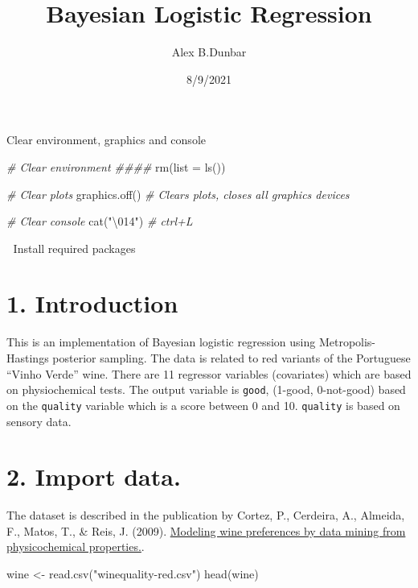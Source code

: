 \documentclass[
]{article}
\title{Bayesian Logistic Regression}
\author{Alex B.Dunbar}
\date{8/9/2021}
\newenvironment{Shaded}{\begin{snugshade}}{\end{snugshade}}
\newcommand{\AttributeTok}[1]{\textcolor[rgb]{0.77,0.63,0.00}{#1}}
\newcommand{\CommentTok}[1]{\textcolor[rgb]{0.56,0.35,0.01}{\textit{#1}}}
\newcommand{\FunctionTok}[1]{\textcolor[rgb]{0.00,0.00,0.00}{#1}}
\newcommand{\NormalTok}[1]{#1}
\newcommand{\OtherTok}[1]{\textcolor[rgb]{0.56,0.35,0.01}{#1}}
\newcommand{\SpecialCharTok}[1]{\textcolor[rgb]{0.00,0.00,0.00}{#1}}
\newcommand{\StringTok}[1]{\textcolor[rgb]{0.31,0.60,0.02}{#1}}
\begin{document}
\maketitle

Clear environment, graphics and console

\begin{Shaded}
\begin{Highlighting}[]
\CommentTok{\# Clear environment \#\#\#\#}
\FunctionTok{rm}\NormalTok{(}\AttributeTok{list =} \FunctionTok{ls}\NormalTok{()) }

\CommentTok{\# Clear plots}
\FunctionTok{graphics.off}\NormalTok{()  }\CommentTok{\# Clears plots, closes all graphics devices}

\CommentTok{\# Clear console}
\FunctionTok{cat}\NormalTok{(}\StringTok{"}\SpecialCharTok{\textbackslash{}014}\StringTok{"}\NormalTok{)  }\CommentTok{\# ctrl+L}
\end{Highlighting}
\end{Shaded}

 Install required packages

\hypertarget{introduction}{%
\section{1. Introduction}\label{introduction}}

This is an implementation of Bayesian logistic regression using
Metropolis-Hastings posterior sampling. The data is related to red
variants of the Portuguese ``Vinho Verde'' wine. There are 11 regressor
variables (covariates) which are based on physiochemical tests. The
output variable is \texttt{good}, (1-good, 0-not-good) based on the
\texttt{quality} variable which is a score between 0 and 10.
\texttt{quality} is based on sensory data.

\hypertarget{import-data.}{%
\section{2. Import data.}\label{import-data.}}

The dataset is described in the publication by Cortez, P., Cerdeira, A.,
Almeida, F., Matos, T., \& Reis, J. (2009).
\href{https://www.sciencedirect.com/science/article/pii/S0167923609001377?casa_token=3l0RostJJXAAAAAA:QC5SBNWeoP2No8AVCA8EMu4R9yLCBh5gyZvsEMEVT1DxrzPwybfUyU0fWb8u4sqeqSyIUQBuIQI}{Modeling
wine preferences by data mining from physicochemical properties.}.

\begin{Shaded}
\begin{Highlighting}[]
\NormalTok{wine }\OtherTok{\textless{}{-}} \FunctionTok{read.csv}\NormalTok{(}\StringTok{"winequality{-}red.csv"}\NormalTok{)}
\FunctionTok{head}\NormalTok{(wine)}
\end{Highlighting}
\end{Shaded}
\end{document}
